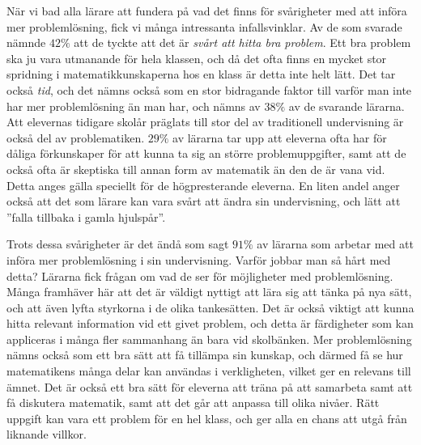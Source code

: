 \textcolor{lila}{När vi bad alla lärare att fundera på vad det finns för svårigheter med att införa mer problemlösning, fick vi många intressanta infallsvinklar. Av de som svarade nämnde $42\%$ att de tyckte att det är \textsl{svårt att hitta bra problem}. Ett bra problem ska ju vara utmanande för hela klassen, och då det ofta finns en mycket stor spridning i matematikkunskaperna hos en klass är detta inte helt lätt. Det tar också \textsl{tid}, och det nämns också som en stor bidragande faktor till varför man inte har mer problemlösning än man har, och nämns av $38\%$ av de svarande lärarna. Att elevernas tidigare skolår präglats till stor del av traditionell undervisning är också del av problematiken. $29\%$ av lärarna tar upp att eleverna ofta har för dåliga förkunskaper för att kunna ta sig an större problemuppgifter, samt att de också ofta är skeptiska till annan form av matematik än den de  är vana vid. Detta anges gälla speciellt för de högpresterande eleverna. En liten andel anger också att det som lärare kan vara svårt att ändra sin undervisning, och lätt att ''falla tillbaka i gamla hjulspår''.}

\textcolor{lila}{Trots dessa svårigheter är det ändå som sagt $91\%$ av lärarna som arbetar med att införa mer problemlösning i sin undervisning. Varför jobbar man så hårt med detta? Lärarna fick frågan om vad de ser för möjligheter med problemlösning. Många framhäver här att det är väldigt nyttigt att lära sig att tänka på nya sätt, och att även lyfta styrkorna i de olika tankesätten. Det är också viktigt att kunna hitta relevant information vid ett givet problem, och detta är färdigheter som kan appliceras i många fler sammanhang än bara vid skolbänken. Mer problemlösning nämns också som ett bra sätt att få tillämpa sin kunskap, och därmed få se hur matematikens många delar kan användas i verkligheten, vilket ger en relevans till ämnet. Det är också ett bra sätt för eleverna att träna på att samarbeta samt att få diskutera matematik, samt att det går att anpassa till olika nivåer. Rätt uppgift kan vara ett problem för en hel klass, och ger alla en chans att utgå från liknande villkor.}